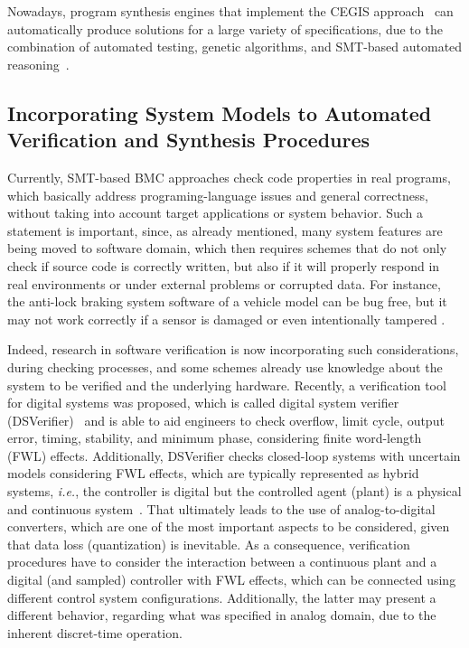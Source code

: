 \documentclass[format=acmsmall, review=false, screen=true]{acmart}
\begin{document}
Nowadays, program synthesis engines that implement the CEGIS approach~\cite{sketch} can automatically produce solutions for a large variety of specifications, due to the combination of automated testing, genetic algorithms, and SMT-based automated reasoning~\cite{Sharma14}.

\subsection{Incorporating System Models to Automated \\ Verification and Synthesis Procedures}

Currently, SMT-based BMC approaches check code properties in real programs, which basically address programing-language issues and general correctness, without taking into account target applications or system behavior. Such a statement is important, since, as already mentioned, many system features are being moved to software domain, which then requires schemes that do not only check if source code is correctly written, but also if it will properly respond in real environments or under external problems or corrupted data. For instance, the anti-lock braking system software of a vehicle model can be bug free, but it may not work correctly if a sensor is damaged or even intentionally tampered \cite{Shoukry}.

Indeed, research in software verification is now incorporating such considerations, during checking processes, and some schemes already use knowledge about the system to be verified and the underlying hardware. Recently, a verification tool for digital systems was proposed, which is called digital system verifier (DSVerifier)~\cite{dsv_spin2015,Monteiro16} and is able to aid engineers to check overflow, limit cycle, output error, timing, stability, and minimum phase, considering finite word-length (FWL) effects. Additionally, DSVerifier checks closed-loop systems with uncertain models considering FWL effects, which are typically represented as hybrid systems, {\it i.e.}, the controller is digital but the controlled agent (plant) is a physical and continuous system~\cite{Bessa17}. That ultimately leads to the use of analog-to-digital converters, which are one of the most important aspects to be considered, given that data loss (quantization) is inevitable. As a consequence, verification procedures have to consider the interaction between a continuous plant and a digital (and sampled) controller with FWL effects, which can be connected using different control system configurations. Additionally, the latter may present a different behavior, regarding what was specified in analog domain, due to the inherent discret-time operation. 
\end{document}
